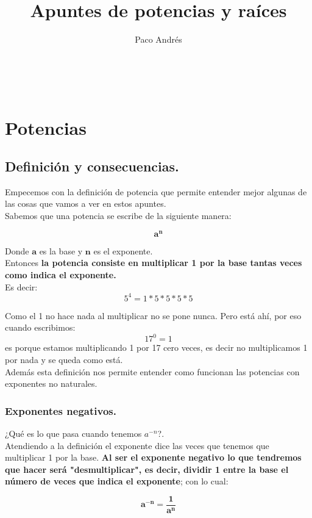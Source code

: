 \documentclass[a4paper,11pt,answers]{exam}
\def \autor{Paco Andrés}
\def \titulo{Apuntes de potencias y raíces}
\begin{document}
\title{\titulo}
\date{}
\author{\autor}
\maketitle

\begin{center}
\doclicenseLongText\\
\vspace{.25cm}
\doclicenseImage
\end{center}




\section{Potencias}
\subsection{Definición y consecuencias.}
Empecemos con la definición de potencia que permite entender mejor algunas de las cosas que vamos a ver en estos apuntes.\\

Sabemos que una potencia se escribe de la siguiente manera:
\begin{Huge}
\[\boldsymbol{a^n}\]
\end{Huge}
Donde $\boldsymbol{a}$ es la base y $\boldsymbol{n}$ es el exponente.\\
Entonces \textbf{la potencia consiste en multiplicar 1 por la base tantas veces como indica el exponente.}\\

Es decir:
\[5^4 = 1*5*5*5*5\]

Como el 1 no hace nada al multiplicar no se pone nunca. Pero está ahí, por eso cuando escribimos:
\[17^0 = 1\]
es porque estamos multiplicando 1 por 17 cero veces, es decir no multiplicamos 1 por nada y se queda como está.\\

Además esta definición nos permite entender como funcionan las potencias con exponentes no naturales.

\subsubsection{Exponentes negativos.}
¿Qué es lo que pasa cuando tenemos $a^{-n}$?.\\
Atendiendo a la definición el exponente dice las veces que tenemos que multiplicar 1 por la base. \textbf{Al ser el exponente negativo lo que tendremos que hacer será "desmultiplicar", es decir, dividir 1 entre la base el número de veces que indica el exponente}; con lo cual:
\begin{Large}
\[\boldsymbol{a^{-n} = \frac{1}{a^n}}\]
\end{Large}
\end{document}
